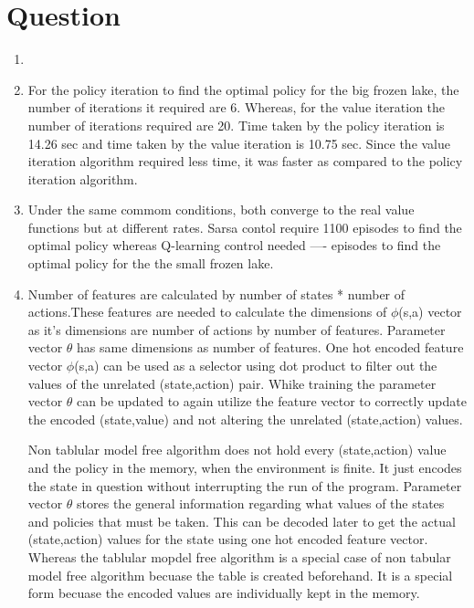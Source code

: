 \documentclass[11pt]{article}
\begin{document}
\section {Question}
	\begin{enumerate}
		\item 
		
		\item For the policy iteration to find the optimal policy for the big frozen lake, the number of iterations it required are 6. Whereas, for the value iteration the number of iterations required are 20. Time taken by the policy iteration is 14.26 sec and time taken by the value iteration is 10.75 sec. Since the value iteration algorithm required less time, it was faster as compared to the policy iteration algorithm.
		
		\item Under the same commom conditions, both converge to the real value functions but at different rates. Sarsa contol require 1100 episodes to find the optimal policy whereas Q-learning control needed ---- episodes to find the optimal policy for the the small frozen lake. 
		
		\item Number of features are calculated by number of states * number of actions.These features are needed to calculate the dimensions of $\phi$(s,a) vector as it's dimensions are number of actions by number of features. Parameter vector $\theta$ has same dimensions as number of features. One hot encoded feature vector $\phi$(s,a) can be used as a selector using dot product to filter out the values of the unrelated (state,action) pair. Whike training the parameter vector $\theta$ can be updated to again utilize the feature vector to correctly update the encoded (state,value) and not altering the unrelated (state,action) values. \par
		
		Non tablular model free algorithm does not hold every (state,action) value and the policy in the memory, when the environment is finite. It just encodes the state in question without interrupting the run of the program. Parameter vector $\theta$ stores the general information regarding what values of the states and policies that must be taken. This can be decoded later to get the actual (state,action) values for the state using one hot encoded feature vector. Whereas the tablular mopdel free algorithm is a special case of non tabular model free algorithm becuase the table is created beforehand. It is a special form becuase the encoded values are individually kept in the memory.
		

\end{enumerate}
\end{document}
